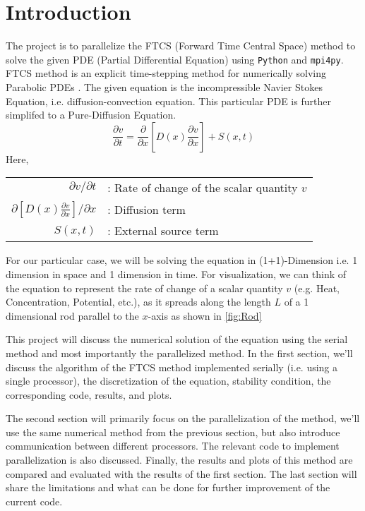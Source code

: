 \section{Introduction}

The project is to parallelize the FTCS (Forward Time Central Space) method to solve the given PDE (Partial Differential Equation) using \texttt{Python} and \texttt{mpi4py}. FTCS method is an explicit time-stepping method for numerically solving Parabolic PDEs \cite{griffiths}. The given equation is the incompressible Navier Stokes Equation, i.e. diffusion-convection equation. This particular PDE is further simplifed to a Pure-Diffusion Equation.
\begin{equation}
    \displaystyle{\frac{\partial v}{\partial t} = \frac{\partial}{\partial x}\left[D(x)\frac{\partial v}{\partial x}\right]+ S(x,t)}
    \label{eq:De}
\end{equation}
Here,
\begin{table*}[h]
    \raggedright
    \begin{tabular}{rl}
        $\partial v/\partial t$ &: Rate of change of the scalar quantity $v$ \\ 
        $\partial [D(x) \frac{\partial v}{\partial x}]$/$\partial x$  &: Diffusion term \\ 
        $S(x,t)$ &: External source term
    \end{tabular}
\end{table*}

For our particular case, we will be solving the equation in (1+1)-Dimension i.e. 1 dimension in space and 1 dimension in time. For visualization, we can think of the equation to represent the rate of change of a scalar quantity $v$ (e.g. Heat, Concentration, Potential, etc.), as it spreads along the length $L$ of a 1 dimensional rod parallel to the $x$-axis as shown in \autoref{fig:Rod}



\figRod

This project will discuss the numerical solution of the equation using the serial method and most importantly the parallelized method. In the first section, we'll discuss the algorithm of the FTCS method implemented serially (i.e. using a single processor), the discretization of the equation, stability condition, the corresponding code, results, and plots.

The second section will primarily focus on the parallelization of the method, we'll use the same numerical method from the previous section, but also introduce communication between different processors. The relevant code to implement parallelization is also discussed. Finally, the results and plots of this method are compared and evaluated with the results of the first section. The last section will share the limitations and what can be done for further improvement of the current code.


